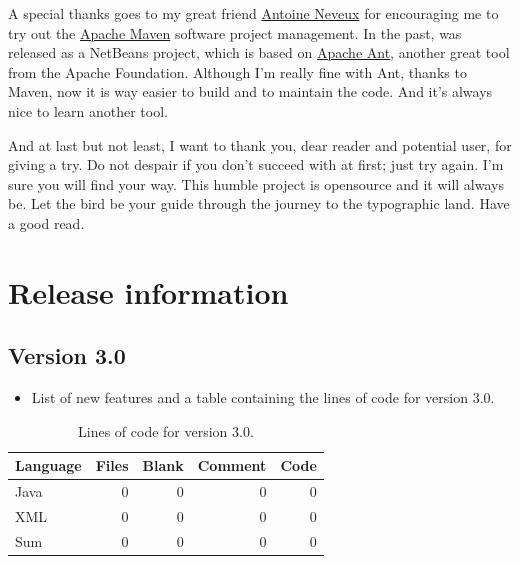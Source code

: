 \documentclass[a4paper,twoside,12pt]{memoir}
\begin{document}
A special thanks goes to my great friend \href{http://antoineneveux.fr/}{Antoine Neveux} for encouraging me to
try out the \href{http://maven.apache.org}{Apache Maven} software project management. In the past, \arara was
released as a NetBeans project, which is based on \href{http://ant.apache.org/}{Apache Ant}, another great tool
from the Apache Foundation. Although I'm really fine with Ant, thanks to Maven, now it is way easier to build and
to maintain the code. And it's always nice to learn another tool.

And at last but not least, I want to thank you, dear reader and potential user, for giving \arara a try. Do not despair
if you don't succeed with \arara at first; just try again. I'm sure you will find your way. This humble project is
opensource and it will always be. Let the bird be your guide through the journey to the typographic land. Have a
good read.

\cleardoublepage

\section*{Release information}

\subsection*{Version 3.0}
\begin{itemize}
\item[\newfeature] 
     List of new features and a table containing the lines of code for
     version 3.0.
\end{itemize}

{\renewcommand{\arraystretch}{1.5}
\begin{table}[ht]
\centering
\caption{Lines of code for version 3.0.}
\begin{tabular}{lrrrr}
\hline
\textbf{Language} & \textbf{Files} & \textbf{Blank} & \textbf{Comment} & \textbf{Code}\\
\hline
\hline
Java & 0 & 0 & 0 & 0\\
XML & 0 & 0 & 0 & 0\\
\hline
Sum & 0 & 0 & 0 & 0\\
\hline
\end{tabular}
\label{tab:locarara30}
\end{table}}
\end{document}
